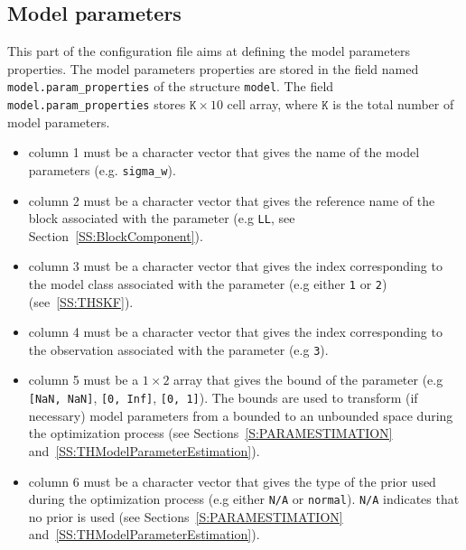 \subsection{Model parameters}
\label{SS:ModelParamProperties}
This part of the configuration file aims at defining the model parameters properties.
The model parameters properties are stored in the field named \lstinline[basicstyle = \mlttfamily \small ]!model.param_properties! of the \MATLAB{} structure \lstinline[basicstyle = \mlttfamily \small ]!model!.
The field \lstinline[basicstyle = \mlttfamily \small ]!model.param_properties! stores $\mathtt{K} \times 10$ cell array, where $\mathtt{K}$ is the total number of model parameters.
\begin{itemize}
\item column 1 must be a character vector that gives the name of the model parameters (e.g.  \lstinline[basicstyle = \mlttfamily \small ]!sigma_w!). 
\item column 2 must be a character vector that gives the reference name of the block associated with the parameter (e.g \lstinline[basicstyle = \mlttfamily \small ]!LL!, see Section~\ref{SS:BlockComponent}).
\item column 3 must be a character vector that gives the index corresponding to the model class associated with the parameter (e.g  either \lstinline[basicstyle = \mlttfamily \small ]!1! or \lstinline[basicstyle = \mlttfamily \small ]!2!) (see~\ref{SS:THSKF}).
\item column 4 must be a character vector that gives the index corresponding to the observation associated with the parameter (e.g \lstinline[basicstyle = \mlttfamily \small ]!3!).
\item column 5 must be a $1\times2$ array that gives the bound of the parameter (e.g \lstinline[basicstyle = \mlttfamily \small ]![NaN, NaN]!,  \lstinline[basicstyle = \mlttfamily \small ]![0, Inf]!, \lstinline[basicstyle = \mlttfamily \small ]![0, 1]!). 
The bounds are used to transform (if necessary) model parameters from a bounded to  an unbounded space during the optimization process (see Sections~\ref{S:PARAMESTIMATION} and~\ref{SS:THModelParameterEstimation}).
\item column 6 must be a character vector that gives the type of the prior used during the optimization process (e.g  either \lstinline[basicstyle = \mlttfamily \small ]!N/A! or \lstinline[basicstyle = \mlttfamily \small ]!normal!). 
\lstinline[basicstyle = \mlttfamily \small ]!N/A! indicates that no prior is used (see Sections~\ref{S:PARAMESTIMATION} and~\ref{SS:THModelParameterEstimation}).

\end{itemize}
